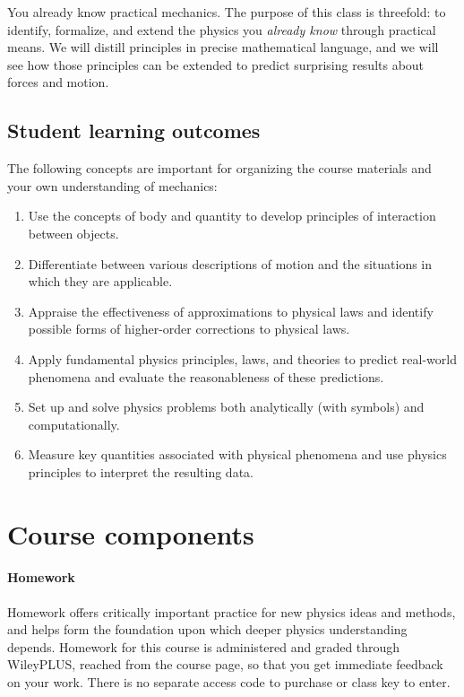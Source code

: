 \documentclass{syllabus}
\begin{document}
You already know practical mechanics. The purpose of this class is threefold: to identify, formalize, and extend the physics you \textit{already know} through practical means. We will distill principles in precise mathematical language, and we will see how those principles can be extended to predict surprising results about forces and motion.

\subsection*{Student learning outcomes}

The following concepts are important for organizing the course materials and your own understanding of mechanics:
\begin{enumerate}[label=\textcolor{CarthageDark}{\bfseries\arabic*.}]
    \item Use the concepts of body and quantity to develop principles of interaction between objects.
    \item Differentiate between various descriptions of motion and the situations in which they are applicable.
    \item Appraise the effectiveness of approximations to physical laws and identify possible forms of higher-order corrections to physical laws.
    \item Apply fundamental physics principles, laws, and theories to predict real-world phenomena and evaluate the reasonableness of these predictions.
    \item Set up and solve physics problems both analytically (with symbols) and computationally.
    \item Measure key quantities associated with physical phenomena and use physics principles to interpret the resulting data.
\end{enumerate}

\section*{Course components}

\paragraph{Homework} Homework offers critically important practice for new physics ideas and methods, and helps form the foundation upon which deeper physics understanding depends. Homework for this course is administered and graded through WileyPLUS, reached from the course {\lms} page, so that you get immediate feedback on your work. There is no separate access code to purchase or class key to enter.
\end{document}
